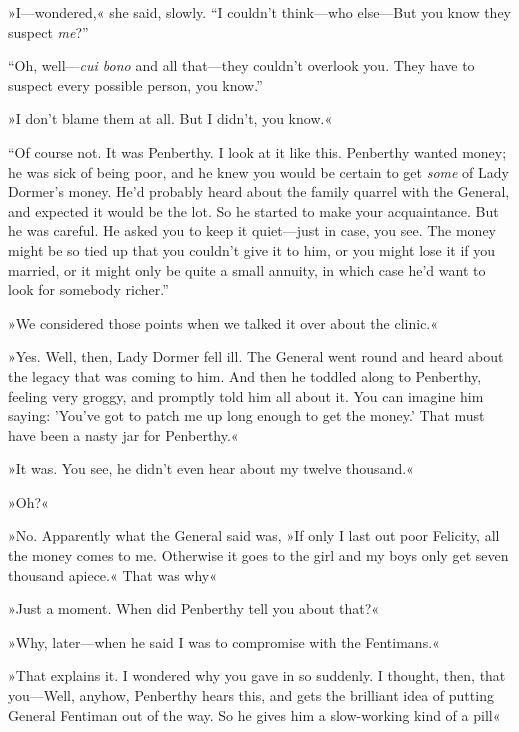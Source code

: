 »I\allowbreak---\allowbreak wondered,« she said, slowly. \enquote{I couldn't think\allowbreak---\allowbreak who else\allowbreak---\allowbreak But you know they suspect \textit{me}?}

\enquote{Oh, well---\textit{cui bono} and all that\allowbreak---\allowbreak they couldn't overlook you. They have to suspect every possible person, you know.}

»I don't blame them at all. But I didn't, you know.«

\enquote{Of course not. It was Penberthy. I look at it like this. Penberthy wanted money; he was sick of being poor, and he knew you would be certain to get \textit{some} of Lady Dormer's money. He'd probably heard about the family quarrel with the General, and expected it would be the lot. So he started to make your acquaintance. But he was careful. He asked you to keep it quiet\allowbreak---\allowbreak just in case, you see. The money might be so tied up that you couldn't give it to him, or you might lose it if you married, or it might only be quite a small annuity, in which case he'd want to look for somebody richer.}

»We considered those points when we talked it over about the clinic.«

»Yes. Well, then, Lady Dormer fell ill. The General went round and heard about the legacy that was coming to him. And then he toddled along to Penberthy, feeling very groggy, and promptly told him all about it. You can imagine him saying: 'You've got to patch me up long enough to get the money.' That must have been a nasty jar for Penberthy.«

»It was. You see, he didn't even hear about my twelve thousand.«

»Oh?«

»No. Apparently what the General said was, »If only I last out poor Felicity, all the money comes to me. Otherwise it goes to the girl and my boys only get seven thousand apiece.« That was why\longdash«

»Just a moment. When did Penberthy tell you about that?«

»Why, later\allowbreak---\allowbreak when he said I was to compromise with the Fentimans.«

»That explains it. I wondered why you gave in so suddenly. I thought, then, that you\allowbreak---\allowbreak Well, anyhow, Penberthy hears this, and gets the brilliant idea of putting General Fentiman out of the way. So he gives him a slow-working kind of a pill\longdash«

